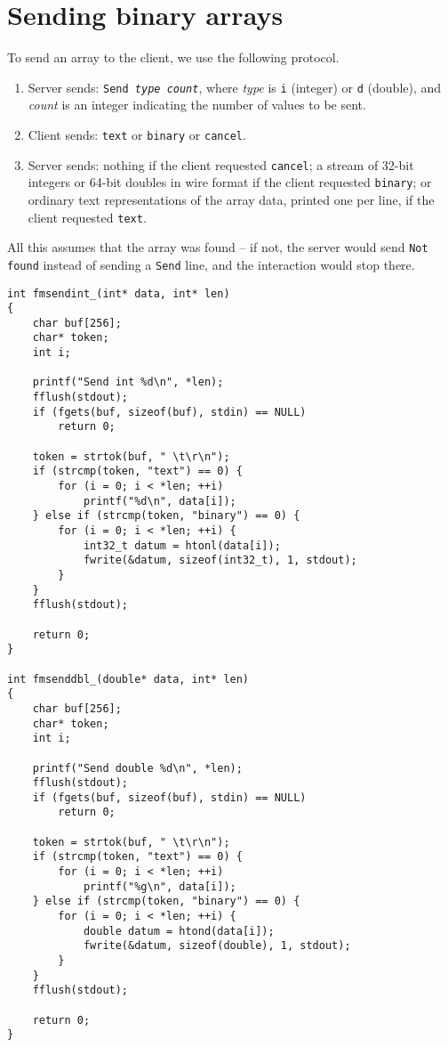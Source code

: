 \section{Sending binary arrays}

To send an array to the client, we use the following protocol.
\begin{enumerate}
\item Server sends: {\tt Send {\it type} {\it count}}, where
{\it type} is {\tt i} (integer) or {\tt d} (double), and
{\it count} is an integer indicating the number of values to
be sent.
\item Client sends: {\tt text} or {\tt binary} or {\tt cancel}.
\item Server sends: nothing if the client requested {\tt cancel}; a
stream of 32-bit integers or 64-bit doubles in wire format if the
client requested {\tt binary}; or ordinary text representations of
the array data, printed one per line, if the client requested
{\tt text}.
\end{enumerate}

All this assumes that the array was found -- if not, the server would
send {\tt Not found} instead of sending a {\tt Send} line, and the
interaction would stop there.

\begin{verbatim}
int fmsendint_(int* data, int* len)
{
    char buf[256];
    char* token;
    int i;

    printf("Send int %d\n", *len);
    fflush(stdout);
    if (fgets(buf, sizeof(buf), stdin) == NULL)
        return 0;

    token = strtok(buf, " \t\r\n");
    if (strcmp(token, "text") == 0) {
        for (i = 0; i < *len; ++i)
            printf("%d\n", data[i]);
    } else if (strcmp(token, "binary") == 0) {
        for (i = 0; i < *len; ++i) {
            int32_t datum = htonl(data[i]);
            fwrite(&datum, sizeof(int32_t), 1, stdout);
        }
    }
    fflush(stdout);

    return 0;
}

int fmsenddbl_(double* data, int* len)
{
    char buf[256];
    char* token;
    int i;

    printf("Send double %d\n", *len);
    fflush(stdout);
    if (fgets(buf, sizeof(buf), stdin) == NULL)
        return 0;

    token = strtok(buf, " \t\r\n");
    if (strcmp(token, "text") == 0) {
        for (i = 0; i < *len; ++i)
            printf("%g\n", data[i]);
    } else if (strcmp(token, "binary") == 0) {
        for (i = 0; i < *len; ++i) {
            double datum = htond(data[i]);
            fwrite(&datum, sizeof(double), 1, stdout);
        }
    }
    fflush(stdout);

    return 0;
}

\end{verbatim}

